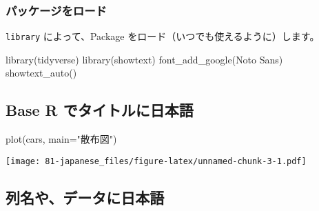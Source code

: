 \documentclass[
]{bxjsbook}
\newenvironment{Shaded}{\begin{snugshade}}{\end{snugshade}}
\newcommand{\AttributeTok}[1]{\textcolor[rgb]{0.77,0.63,0.00}{#1}}
\newcommand{\FunctionTok}[1]{\textcolor[rgb]{0.00,0.00,0.00}{#1}}
\newcommand{\NormalTok}[1]{#1}
\newcommand{\StringTok}[1]{\textcolor[rgb]{0.31,0.60,0.02}{#1}}
\theoremstyle{definition}
\theoremstyle{definition}
\theoremstyle{definition}
\theoremstyle{definition}
\theoremstyle{remark}
\begin{document}
\hypertarget{ux30d1ux30c3ux30b1ux30fcux30b8ux3092ux30edux30fcux30c9}{%
\subsubsection{パッケージをロード}\label{ux30d1ux30c3ux30b1ux30fcux30b8ux3092ux30edux30fcux30c9}}

\texttt{library} によって、Package をロード（いつでも使えるように）します。

\begin{Shaded}
\begin{Highlighting}[]
\FunctionTok{library}\NormalTok{(tidyverse)}
\FunctionTok{library}\NormalTok{(showtext) }
\FunctionTok{font\_add\_google}\NormalTok{(}\StringTok{\textquotesingle{}Noto Sans\textquotesingle{}}\NormalTok{)}
\FunctionTok{showtext\_auto}\NormalTok{()}
\end{Highlighting}
\end{Shaded}

\hypertarget{base-r-ux3067ux30bfux30a4ux30c8ux30ebux306bux65e5ux672cux8a9e}{%
\subsection{Base R でタイトルに日本語}\label{base-r-ux3067ux30bfux30a4ux30c8ux30ebux306bux65e5ux672cux8a9e}}

\begin{Shaded}
\begin{Highlighting}[]
\FunctionTok{plot}\NormalTok{(cars, }\AttributeTok{main=}\StringTok{"散布図"}\NormalTok{)}
\end{Highlighting}
\end{Shaded}

\texttt{[image: 81-japanese\_files/figure-latex/unnamed-chunk-3-1.pdf]}

\hypertarget{ux5217ux540dux3084ux30c7ux30fcux30bfux306bux65e5ux672cux8a9e}{%
\subsection{列名や、データに日本語}\label{ux5217ux540dux3084ux30c7ux30fcux30bfux306bux65e5ux672cux8a9e}}
\end{document}
